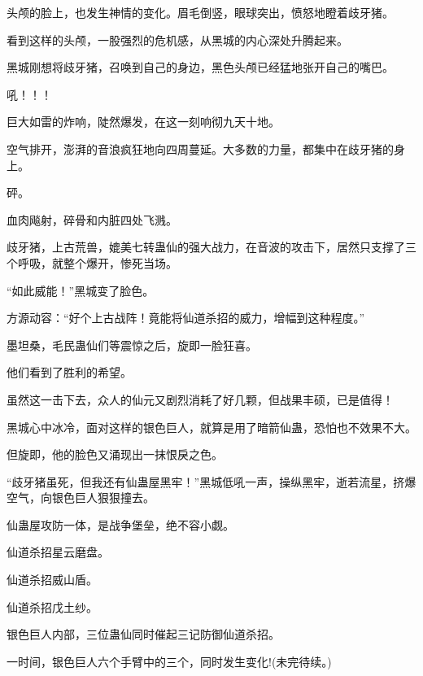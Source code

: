 \begin{this_body}
头颅的脸上，也发生神情的变化。眉毛倒竖，眼球突出，愤怒地瞪着歧牙猪。

看到这样的头颅，一股强烈的危机感，从黑城的内心深处升腾起来。

黑城刚想将歧牙猪，召唤到自己的身边，黑色头颅已经猛地张开自己的嘴巴。

吼！！！

巨大如雷的炸响，陡然爆发，在这一刻响彻九天十地。

空气排开，澎湃的音浪疯狂地向四周蔓延。大多数的力量，都集中在歧牙猪的身上。

砰。

血肉飚射，碎骨和内脏四处飞溅。

歧牙猪，上古荒兽，媲美七转蛊仙的强大战力，在音波的攻击下，居然只支撑了三个呼吸，就整个爆开，惨死当场。

“如此威能！”黑城变了脸色。

方源动容：“好个上古战阵！竟能将仙道杀招的威力，增幅到这种程度。”

墨坦桑，毛民蛊仙们等震惊之后，旋即一脸狂喜。

他们看到了胜利的希望。

虽然这一击下去，众人的仙元又剧烈消耗了好几颗，但战果丰硕，已是值得！

黑城心中冰冷，面对这样的银色巨人，就算是用了暗箭仙蛊，恐怕也不效果不大。

但旋即，他的脸色又涌现出一抹恨戾之色。

“歧牙猪虽死，但我还有仙蛊屋黑牢！”黑城低吼一声，操纵黑牢，逝若流星，挤爆空气，向银色巨人狠狠撞去。

仙蛊屋攻防一体，是战争堡垒，绝不容小觑。

仙道杀招星云磨盘。

仙道杀招威山盾。

仙道杀招戊土纱。

银色巨人内部，三位蛊仙同时催起三记防御仙道杀招。

一时间，银色巨人六个手臂中的三个，同时发生变化!(未完待续。)

\end{this_body}

